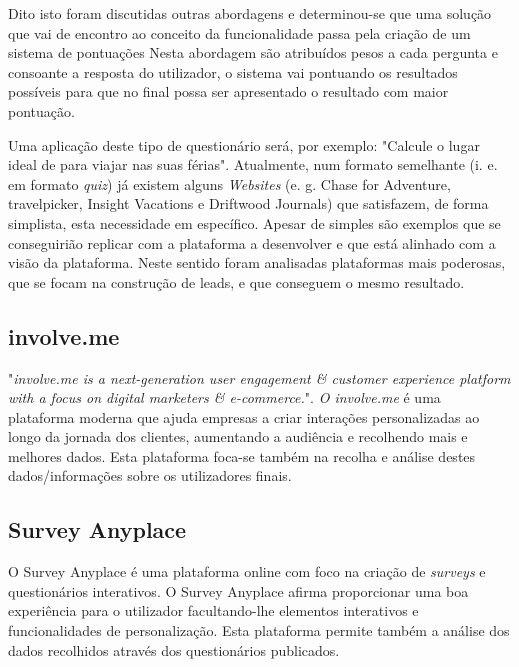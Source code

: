 Dito isto foram discutidas outras abordagens e determinou-se que uma solução que vai de encontro ao conceito da funcionalidade passa pela criação de um sistema de pontuações
Nesta abordagem são atribuídos pesos a cada pergunta e consoante a resposta do utilizador, o sistema vai pontuando os resultados possíveis para que no final possa ser apresentado o resultado com maior pontuação.

Uma aplicação deste tipo de questionário será, por exemplo: "Calcule o lugar ideal de para viajar nas suas férias". Atualmente, num formato semelhante (i. e. em formato \textit{quiz}) já existem alguns \textit{Websites} (e. g. Chase for Adventure\cite{chaseforadventure}, travelpicker\cite{travelpicker}, Insight Vacations\cite{insightvacations} e Driftwood Journals\cite{driftwoodjournals}) que satisfazem, de forma simplista, esta necessidade em específico. Apesar de simples são exemplos que se conseguirião replicar com a plataforma a desenvolver e que está alinhado com a visão da plataforma. Neste sentido foram analisadas plataformas mais poderosas, que se focam na construção de leads, e que conseguem o mesmo resultado.


\subsection{involve.me}
\label{involvemeM}


"\textit{involve.me is a next-generation user engagement \& customer experience platform with a focus on digital marketers \& e-commerce.}"\cite{involve}. \textit{O involve.me} é uma plataforma moderna que ajuda empresas a criar interações personalizadas ao longo da jornada dos clientes, aumentando a audiência e recolhendo mais e melhores dados. Esta plataforma foca-se também na recolha e análise destes dados/informações sobre os utilizadores finais.


\subsection{Survey Anyplace}
\label{surveyanyplaceM}




O Survey Anyplace é uma plataforma online com foco na criação de \textit{surveys} e questionários interativos. O Survey Anyplace afirma proporcionar uma boa experiência para o utilizador facultando-lhe elementos interativos e funcionalidades de personalização. Esta plataforma permite também a análise dos dados recolhidos através dos questionários publicados.


